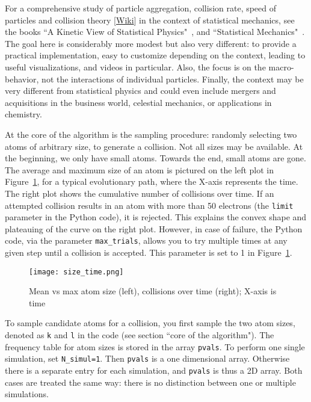 \documentclass[oneside,10pt]{book}
\begin{document}
For a comprehensive study of particle aggregation, collision rate, speed of particles and \textcolor{index}{collision theory} [\href{https://en.wikipedia.org/wiki/Collision_theory}{Wiki}] in the context of statistical mechanics, see the books 
``A Kinetic View of Statistical Physics"~\cite{knie}, and ``Statistical Mechanics"~\cite{sp496}. 
The goal here is considerably more modest but also very different: to provide
 a practical implementation, easy to customize depending on the context, leading to useful visualizations, and videos in particular. Also, the focus is on the macro-behavior, not the interactions of individual particles. Finally, the context may be very different from statistical physics and could even include mergers and acquisitions 
 in the business world, celestial mechanics, or applications in chemistry.


At the core of the algorithm is the sampling procedure: randomly selecting two atoms of arbitrary size, to generate a collision. Not all sizes may be available. At the beginning, we only have small atoms. Towards the end, small atoms are gone. The average and maximum size of an atom is pictured on the left plot in Figure~\ref{fig:pif65lkh}, for a
 typical evolutionary path, where the X-axis represents the time. The right plot shows the cumulative number of collisions over time. If an attempted collision results in an atom with more than 50 electrons (the \texttt{limit} parameter in the Python code), it is rejected. This explains the convex shape and plateauing of the curve on the right plot. However, in case of failure, the Python code, via the parameter \texttt{max\_trials}, allows you to try multiple times at any given step until a collision is accepted. This parameter is set to 1 in Figure~\ref{fig:pif65lkh}.

\begin{figure}[H]
\centering
\texttt{[image: size\_time.png]}  
\caption{Mean vs max atom size (left), collisions over time (right); X-axis is time}
\label{fig:pif65lkh}
\end{figure}

To sample candidate atoms for a collision, you first sample the two atom sizes, denoted as 
\texttt{k} and \texttt{l} in the code (see section ``core of the algorithm"). The frequency table for atom sizes is stored
 in the array \texttt{pvals}. To perform one single simulation, set \texttt{N\_simul=1}. Then \texttt{pvals} is a 
 one dimensional array. Otherwise there is a separate entry for each simulation, and \texttt{pvals} is thus a 2D array.
 Both cases are treated the same way: there is no distinction between one or multiple simulations.
\end{document}
